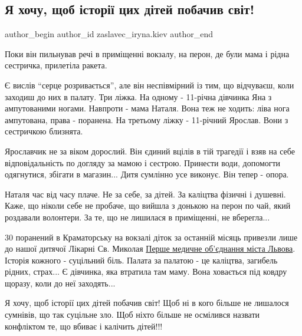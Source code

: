  
 
 
 
 
 
\subsection{Я хочу, щоб історії цих дітей побачив світ!}
\label{sec:12_05_2022.fb.zaslavec_iryna.kiev.1.deti_kramatorsk}
 
\ifcmt
 author_begin
   author_id zaslavec_iryna.kiev
 author_end
\fi


Поки він пильнував речі в приміщенні вокзалу, на перон, де були мама і рідна
сестричка, прилетіла ракета. 


Є вислів \enquote{серце розривається}, але він неспівмірний із тим, що відчуваєш, коли
заходиш до них в палату. Три ліжка. На одному - 11-річна дівчинка Яна з
ампутованими ногами. Навпроти - мама Наталя. Вона теж не ходить: ліва нога
ампутована, права - поранена. На третьому ліжку - 11-річний Ярослав. Вони з
сестричкою близнята. 


Ярославчик не за віком дорослий. Він єдиний вцілів в тій трагедії і взяв на
себе відповідальність по догляду за мамою і сестрою. Принести води, допомогти
одягнутися, збігати в магазин... Дитя сумлінно усе виконує. Він тепер - опора. 


Наталя час від часу плаче. Не за себе, за дітей. За каліцтва фізичні і душевні.
Каже, що ніколи себе не пробаче, що вийшла з донькою на перон по чай, який
роздавали волонтери. За те, що не лишилася в приміщенні, не вберегла... 

30 поранений в Краматорську на вокзалі діток за останній місяць привезли лише
до нашої дитячої Лікарні Св. Миколая
\href{https://www.facebook.com/1tmolviv/}{Перше медичне об'єднання міста
Львова}.  Історія кожного - суцільний біль. Палата за палатою - це каліцтва,
загибель рідних, страх... Є дівчинка, яка втратила там маму. Вона ховається під
ковдру щоразу, коли до неї заходять...

Я хочу, щоб історії цих дітей побачив світ! Щоб ні в кого більше не лишалося
сумнівів, що так суцільне зло. Щоб ніхто більше не осмілився назвати конфліктом
те, що вбиває і калічить дітей!!!


